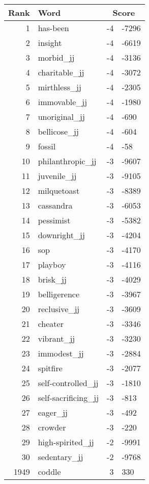 \begin{longtable}[!htbp]{| rlr@{.}l |}
    \hline
    \textbf{Rank} & \textbf{Word} & \multicolumn{2}{c|}{\textbf{Score}} \\
    \hline
    \endhead
    1 & has-been & -4 & -7296 \\
    2 & insight & -4 & -6619 \\
    3 & morbid\_jj & -4 & -3136 \\
    4 & charitable\_jj & -4 & -3072 \\
    5 & mirthless\_jj & -4 & -2305 \\
    6 & immovable\_jj & -4 & -1980 \\
    7 & unoriginal\_jj & -4 & -690 \\
    8 & bellicose\_jj & -4 & -604 \\
    9 & fossil & -4 & -58 \\
    10 & philanthropic\_jj & -3 & -9607 \\
    11 & juvenile\_jj & -3 & -9105 \\
    12 & milquetoast & -3 & -8389 \\
    13 & cassandra & -3 & -6053 \\
    14 & pessimist & -3 & -5382 \\
    15 & downright\_jj & -3 & -4204 \\
    16 & sop & -3 & -4170 \\
    17 & playboy & -3 & -4116 \\
    18 & brisk\_jj & -3 & -4029 \\
    19 & belligerence & -3 & -3967 \\
    20 & reclusive\_jj & -3 & -3609 \\
    21 & cheater & -3 & -3346 \\
    22 & vibrant\_jj & -3 & -3230 \\
    23 & immodest\_jj & -3 & -2884 \\
    24 & spitfire & -3 & -2077 \\
    25 & self-controlled\_jj & -3 & -1810 \\
    26 & self-sacrificing\_jj & -3 & -813 \\
    27 & eager\_jj & -3 & -492 \\
    28 & crowder & -3 & -220 \\
    29 & high-spirited\_jj & -2 & -9991 \\
    30 & sedentary\_jj & -2 & -9768 \\
    1949 & coddle & 3 & 330 \\

\end{longtable}
